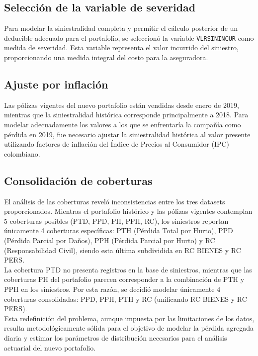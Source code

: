 \subsection{Selección de la variable de severidad}

Para modelar la siniestralidad completa y permitir el cálculo posterior de un deducible adecuado para el portafolio, se seleccionó la variable \texttt{VLRSININCUR} como medida de severidad. Esta variable representa el valor incurrido del siniestro, proporcionando una medida integral del costo para la aseguradora.

\subsection{Ajuste por inflación}

Las pólizas vigentes del nuevo portafolio están vendidas desde enero de 2019, mientras que la siniestralidad histórica corresponde principalmente a 2018. Para modelar adecuadamente los valores a los que se enfrentaría la compañía como pérdida en 2019, fue necesario ajustar la siniestralidad histórica al valor presente utilizando factores de inflación del Índice de Precios al Consumidor (IPC) colombiano.

\subsection{Consolidación de coberturas}

El análisis de las coberturas reveló inconsistencias entre los tres datasets proporcionados. Mientras el portafolio histórico y las pólizas vigentes contemplan 5 coberturas posibles (PTD, PPD, PH, PPH, RC), los siniestros reportan únicamente 4 coberturas específicas: PTH (Pérdida Total por Hurto), PPD (Pérdida Parcial por Daños), PPH (Pérdida Parcial por Hurto) y RC (Responsabilidad Civil), siendo esta última subdividida en RC BIENES y RC PERS.\\

La cobertura PTD no presenta registros en la base de siniestros, mientras que las coberturas PH del portafolio parecen corresponder a la combinación de PTH y PPH en los siniestros. Por esta razón, se decidió modelar únicamente 4 coberturas consolidadas: PPD, PPH, PTH y RC (unificando RC BIENES y RC PERS).\\

Esta redefinición del problema, aunque impuesta por las limitaciones de los datos, resulta metodológicamente sólida para el objetivo de modelar la pérdida agregada diaria y estimar los parámetros de distribución necesarios para el análisis actuarial del nuevo portafolio.